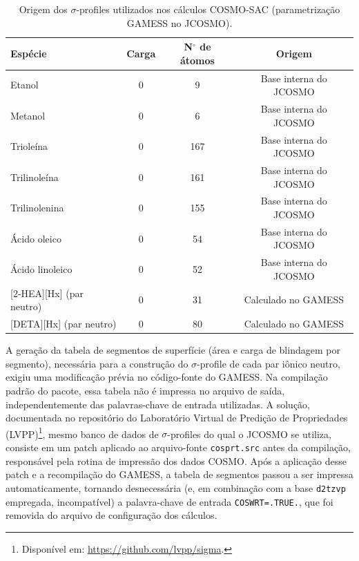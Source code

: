 \begin{table}[H]
    \centering
    \caption{Origem dos $\sigma$-profiles utilizados nos cálculos COSMO-SAC (parametrização GAMESS no JCOSMO).}
    \label{tab:cosmo_detalhes}
    \begin{tabular}{lccc}
        \toprule
        \textbf{Espécie} & \textbf{Carga} &
        \textbf{N$^{\circ}$ de átomos} & \textbf{Origem} \\
        \midrule
        Etanol             &  0 &   9 & Base interna do JCOSMO \\
        Metanol            &  0 &   6 & Base interna do JCOSMO \\
        Trioleína          &  0 & 167 & Base interna do JCOSMO \\
        Trilinoleína       &  0 & 161 & Base interna do JCOSMO \\
        Trilinolenina      &  0 & 155 & Base interna do JCOSMO \\
        Ácido oleico       &  0 &  54 & Base interna do JCOSMO \\
        Ácido linoleico    &  0 &  52 & Base interna do JCOSMO \\
        {[2-HEA][Hx]} (par neutro) &  0 &  31 & Calculado no GAMESS \\
        {[DETA][Hx]} (par neutro)  &  0 &  80 & Calculado no GAMESS \\
        \bottomrule
    \end{tabular}
\end{table}

A geração da tabela de segmentos de superfície (área e carga de blindagem por segmento), necessária para a construção do $\sigma$-profile de cada par iônico neutro, exigiu uma modificação prévia no código-fonte do GAMESS. Na compilação padrão do pacote, essa tabela não é impressa no arquivo de saída, independentemente das palavras-chave de entrada utilizadas. A solução, documentada no repositório do Laboratório Virtual de Predição de Propriedades (LVPP)\footnote{Disponível em: \url{https://github.com/lvpp/sigma}.}, mesmo banco de dados de $\sigma$-profiles do qual o JCOSMO se utiliza, consiste em um patch aplicado ao arquivo-fonte \texttt{cosprt.src} antes da compilação, responsável pela rotina de impressão dos dados COSMO. Após a aplicação desse patch e a recompilação do GAMESS, a tabela de segmentos passou a ser impressa automaticamente, tornando desnecessária (e, em combinação com a base \texttt{d2tzvp} empregada, incompatível) a palavra-chave de entrada \texttt{COSWRT=.TRUE.}, que foi removida do arquivo de configuração dos cálculos.

